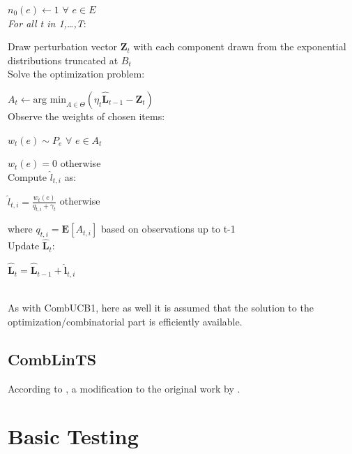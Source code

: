 $n_0(e) \leftarrow 1$ $\forall$ $e \in E$\\

\noindent \textit{For all t in 1,\ldots,T}:

Draw perturbation vector $\mathbf{Z}_t$ with each component drawn from the exponential distributions truncated at $B_t$\\

Solve the optimization problem:

\indent \indent $A_t \leftarrow \textrm{arg min}_{A\in \Theta}(\eta_t\mathbf{\hat{L}}_{t-1}-\mathbf{Z}_t)$\\

Observe the weights of chosen items:

\indent \indent $w_t(e) \sim P_e$ $\forall$ $e \in A_t$

\indent \indent $w_t(e)=0$ otherwise\\

Compute $\hat{l}_{t,i}$ as:

\indent \indent $\hat{l}_{t,i}=\frac{w_t(e)}{q_{t,i}+\gamma_t}$ otherwise

\indent \indent where $q_{t,i}=\textbf{E}[A_{t,i}]$ based on observations up to t-1\\

Update $\mathbf{\hat{L}}_t$:

\indent \indent $\mathbf{\hat{L}}_t=\mathbf{\hat{L}}_{t-1}+\mathbf{\hat{l}}_{t,i}$

\noindent \hrulefill\\

As with CombUCB1, here as well it is assumed that the solution to the optimization/combinatorial part is efficiently available.

\subsection{CombLinTS}

According to \cite{wen2015efficient}, a modification to the original work by \cite{thompson1933}.


\pagebreak


\section{Basic Testing}

